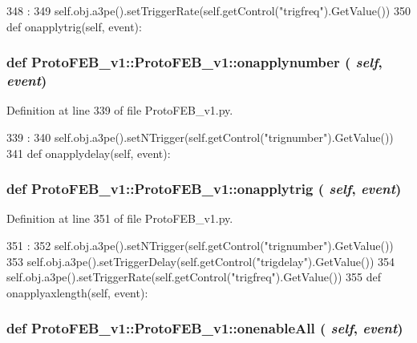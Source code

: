 \begin{DoxyCode}
348                                 :
349         self.obj.a3pe().setTriggerRate(self.getControl("trigfreq").GetValue())
350 
    def onapplytrig(self, event):
\end{DoxyCode}
\hypertarget{classProtoFEB__v1_1_1ProtoFEB__v1_a7bb33dac274f782f0b3dd1a1e1db57e7}{
\subsubsection[{onapplynumber}]{\setlength{\rightskip}{0pt plus 5cm}def ProtoFEB\_\-v1::ProtoFEB\_\-v1::onapplynumber ( {\em self}, \/   {\em event})}}
\label{classProtoFEB__v1_1_1ProtoFEB__v1_a7bb33dac274f782f0b3dd1a1e1db57e7}


Definition at line 339 of file ProtoFEB\_\-v1.py.


\begin{DoxyCode}
339                                   :
340         self.obj.a3pe().setNTrigger(self.getControl("trignumber").GetValue())
341 
    def onapplydelay(self, event):
\end{DoxyCode}
\hypertarget{classProtoFEB__v1_1_1ProtoFEB__v1_acd4b25906a05caf26da463888cd8927b}{
\subsubsection[{onapplytrig}]{\setlength{\rightskip}{0pt plus 5cm}def ProtoFEB\_\-v1::ProtoFEB\_\-v1::onapplytrig ( {\em self}, \/   {\em event})}}
\label{classProtoFEB__v1_1_1ProtoFEB__v1_acd4b25906a05caf26da463888cd8927b}


Definition at line 351 of file ProtoFEB\_\-v1.py.


\begin{DoxyCode}
351                                 :
352         self.obj.a3pe().setNTrigger(self.getControl("trignumber").GetValue())
353         self.obj.a3pe().setTriggerDelay(self.getControl("trigdelay").GetValue())
354         self.obj.a3pe().setTriggerRate(self.getControl("trigfreq").GetValue())
355 
    def onapplyaxlength(self, event):
\end{DoxyCode}
\hypertarget{classProtoFEB__v1_1_1ProtoFEB__v1_a02fb97b201dc6054dccd7de8a67e825f}{
\subsubsection[{onenableAll}]{\setlength{\rightskip}{0pt plus 5cm}def ProtoFEB\_\-v1::ProtoFEB\_\-v1::onenableAll ( {\em self}, \/   {\em event})}}
\label{classProtoFEB__v1_1_1ProtoFEB__v1_a02fb97b201dc6054dccd7de8a67e825f}


